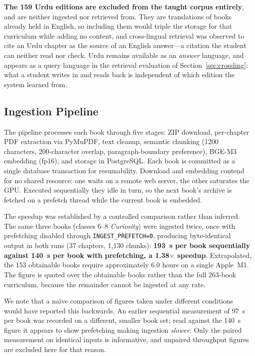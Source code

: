 \documentclass[conference]{IEEEtran}
\begin{document}
\textbf{The 159 Urdu editions are excluded from the taught corpus entirely}, and are neither ingested nor retrieved from. They are translations of books already held in English, so including them would triple the storage for that curriculum while adding no content, and cross-lingual retrieval was observed to cite an Urdu chapter as the source of an English answer---a citation the student can neither read nor check. Urdu remains available as an \emph{answer} language, and appears as a query language in the retrieval evaluation of Section~\ref{sec:crossling}: what a student writes in and reads back is independent of which edition the system learned from.

\subsection{Ingestion Pipeline}
The pipeline processes each book through five stages: ZIP download, per-chapter PDF extraction via PyMuPDF, text cleanup, semantic chunking (1200 characters, 200-character overlap, paragraph-boundary preference), BGE-M3 embedding (fp16), and storage in PostgreSQL. Each book is committed as a single database transaction for resumability. Download and embedding contend for no shared resource: one waits on a remote web server, the other saturates the GPU. Executed sequentially they idle in turn, so the next book's archive is fetched on a prefetch thread while the current book is embedded.

The speedup was established by a controlled comparison rather than inferred. The same three books (classes 6--8 \textit{Curiosity}) were ingested twice, once with prefetching disabled through \texttt{INGEST\_PREFETCH=0}, producing byte-identical output in both runs (37 chapters, 1{,}130 chunks): \textbf{193~s per book sequentially against 140~s per book with prefetching, a 1.38$\times$ speedup}. Extrapolated, the 153 obtainable books require approximately 6.0 hours on a single Apple~M1. The figure is quoted over the obtainable books rather than the full 263-book curriculum, because the remainder cannot be ingested at any rate.

We note that a naive comparison of figures taken under different conditions would have reported this backwards. An earlier sequential measurement of 97~s per book was recorded on a different, smaller book set; read against the 140~s figure it appears to show prefetching making ingestion \textit{slower}. Only the paired measurement on identical inputs is informative, and unpaired throughput figures are excluded here for that reason.
\end{document}
